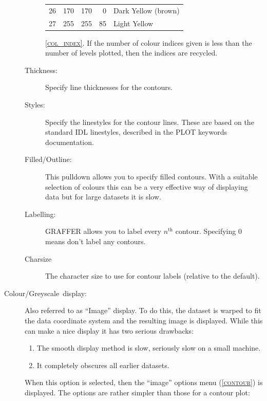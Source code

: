 \documentclass[11pt,twoside,english]{article}
\begin{document}
\begin{description}
\begin{description}
\begin{table}[!ht]
\begin{center}
\begin{tabular}{|c|rrr|l|}
          26 & 170 & 170 & 0 & Dark Yellow (brown)\\
          27 & 255 & 255 & 85 & Light Yellow\\
          \hline
        \end{tabular}
      \end{center}
    \end{table}
    \textsc{\autoref{col_index}}. If the number of colour indices given
    is less than the number of levels plotted, then the indices are
    recycled.
  \item [Thickness:]Specify line thicknesses for the contours.
  \item [Styles:]Specify the linestyles for the contour lines. These
    are based on the standard IDL linestyles, described in the PLOT keywords
    documentation.
  \item [Filled/Outline:]This pulldown allows you to specify filled
    contours.  With a suitable selection of colours this can be a very
    effective way of displaying data but for large datasets it is slow.

  \item [Labelling:] GRAFFER allows you to label every
    $n^{\mathrm{th}}$ contour. Specifying 0 means don't label any
    contours.
  \item[Charsize] The character size to use for contour labels
    (relative to the default).
  \end{description}

\item [Colour/Greyscale~display:]Also referred to as {}``Image''
  display.  To do this, the dataset is warped to fit the data
  coordinate system and the resulting image is displayed. While this
  can make a nice display it has two serious drawbacks:

  \begin{enumerate}
  \item The smooth display method is slow, seriously slow on a small machine.
  \item It completely obscures all earlier datasets.
  \end{enumerate}
  When this option is selected, then the {}``image'' options menu
  (\textsc{\autoref{contour}}) is displayed. The options are rather
  simpler than those for a contour plot:


\end{description}
\end{document}
